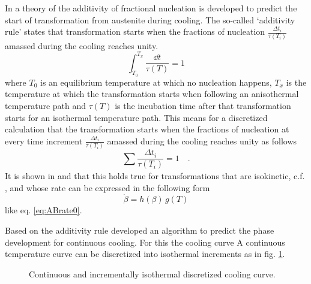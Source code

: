 In \cite{scheil_anlaufzeit_1935} a theory of the additivity of fractional nucleation is developed to predict the start of transformation from austenite during cooling.  The so-called `additivity rule' states that transformation starts when the fractions of nucleation $\frac{\Delta t_i}{\tau(T_i)}$ amassed during the cooling reaches unity.
\begin{equation}
	\int^{T_{x}}_{T_{0}} \frac{\dd{t}}{\tau(T)} = 1 %
\end{equation}
where  $T_{0}$ is an equilibrium temperature at which no nucleation happens, $T_{x}$ is the temperature at which the transformation starts when following an anisothermal temperature path and $\tau(T)$ is the incubation time after that transformation starts for an isothermal temperature path. This means for a discretized calculation that the transformation starts when the fractions of nucleation at every time increment $\frac{\Delta t_i}{\tau(T_i)}$ amassed during the cooling reaches unity as follows
\begin{equation}
	\sum_{}^{} \frac{\Delta t_i}{\tau(T_i)} = 1 \quad.
\end{equation}
It is shown in \cite{lusk_rule_1997} and \cite{christian_formal_2002} that this holds true for transformations that are isokinetic, c.f. \cite{cahn_transformation_1956}, and whose rate can be expressed in the following form 
\begin{equation}
	\dot \beta = h(\beta)\, g(T)
\end{equation}
like eq. \ref{eq:ABrate0}.

Based on the additivity rule \cite{tzitzelkov_mathematische_1974} developed an algorithm to predict the phase development for continuous cooling. 
For this the cooling curve 
A continuous temperature curve can be discretized into isothermal increments as in fig. \ref{fig:discCoolCurve}. 

\begin{figure}[h]%
\centering
{} 
\caption{Continuous and incrementally isothermal discretized cooling curve.}
\label{fig:discCoolCurve}
\end{figure}



